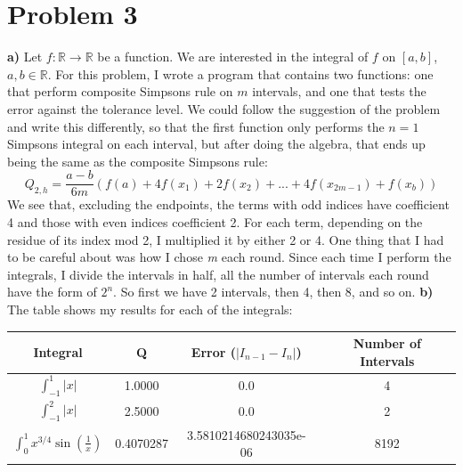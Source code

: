 \documentclass[12pt,letterpaper]{article}
\begin{document}
\section*{Problem 3} \textbf{a)} Let $f:\mathbb{R} \xrightarrow{} \mathbb{R}$ be a function. We are interested in the integral of $f$ on $[a,b]$, $a,b \in \mathbb{R}$.  
\newline
\newline For this problem, I wrote a program that contains two functions: one that perform composite Simpsons rule on $m$ intervals, and one that tests the error against the tolerance level. We could follow the suggestion of the problem and write this differently, so that the first function only performs the $n = 1$ Simpsons integral on each interval, but after doing the algebra, that ends up being the same as the composite Simpsons rule: \begin{equation}
   Q_{2,h} = \frac{a-b}{6 m}\left(f(a)+4f(x_1)+2f(x_2)+...+4 f (x_{ 2m-1} )+ f (x_b )\right)
\end{equation}
We see that, excluding the endpoints, the terms with odd indices have coefficient 4 and those with even indices coefficient 2. For each term, depending on the residue of its index mod 2, I multiplied it by either 2 or 4.
\newline 
\newline
One thing that I had to be careful about was how I chose \textit{m} each round. Since each time I perform the integrals, I divide the intervals in half, all the number of intervals each round have the form of $2^n$. So first we have 2 intervals, then 4, then 8, and so on.
\newline \newline \textbf{b)}
The table shows my results for each of the integrals:
\begin{center}
 \begin{tabular}{||c c c c||} 
 \hline
 Integral & Q & Error ($|I_{n-1} - I_{n}|$)  & Number of Intervals \\ [0.5ex] 
 \hline\hline
 $\int_{-1}^1 |x|$ & 1.0000 & 0.0 & 4 \\ 
 \hline
 $\int_{-1}^2 |x|$ & 2.5000 & 0.0 & 2 \\
 \hline
  $\int_{0}^1 x^{3/4} \sin{(\frac{1}{x})}$ & 0.4070287 & 3.5810214680243035e-06 & 8192  \\ [1ex] 
 \hline
\end{tabular}
\end{center}

\end{document}
